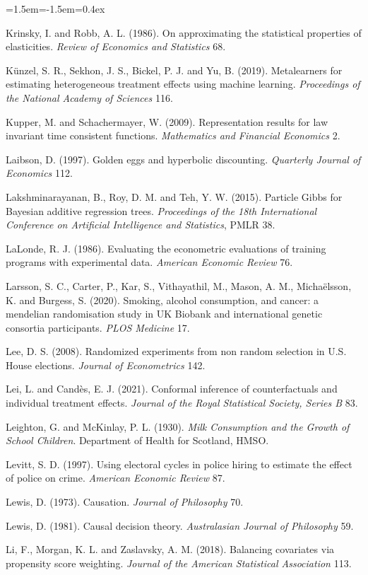 \begin{list}{}{\leftmargin=1.5em\itemindent=-1.5em\itemsep=0.4ex}
\item Krinsky, I. and Robb, A. L. (1986). On approximating the statistical properties of elasticities. \emph{Review of Economics and Statistics} 68.
\item K\"unzel, S. R., Sekhon, J. S., Bickel, P. J. and Yu, B. (2019). Metalearners for estimating heterogeneous treatment effects using machine learning. \emph{Proceedings of the National Academy of Sciences} 116.
\item Kupper, M. and Schachermayer, W. (2009). Representation results for law invariant time consistent functions. \emph{Mathematics and Financial Economics} 2.
\item Laibson, D. (1997). Golden eggs and hyperbolic discounting. \emph{Quarterly Journal of Economics} 112.
\item Lakshminarayanan, B., Roy, D. M. and Teh, Y. W. (2015). Particle Gibbs for Bayesian additive regression trees. \emph{Proceedings of the 18th International Conference on Artificial Intelligence and Statistics}, PMLR 38.
\item LaLonde, R. J. (1986). Evaluating the econometric evaluations of training programs with experimental data. \emph{American Economic Review} 76.
\item Larsson, S. C., Carter, P., Kar, S., Vithayathil, M., Mason, A. M., Micha\"elsson, K. and Burgess, S. (2020). Smoking, alcohol consumption, and cancer: a mendelian randomisation study in UK Biobank and international genetic consortia participants. \emph{PLOS Medicine} 17.
\item Lee, D. S. (2008). Randomized experiments from non random selection in U.S. House elections. \emph{Journal of Econometrics} 142.
\item Lei, L. and Cand\`es, E. J. (2021). Conformal inference of counterfactuals and individual treatment effects. \emph{Journal of the Royal Statistical Society, Series B} 83.
\item Leighton, G. and McKinlay, P. L. (1930). \emph{Milk Consumption and the Growth of School Children}. Department of Health for Scotland, HMSO.
\item Levitt, S. D. (1997). Using electoral cycles in police hiring to estimate the effect of police on crime. \emph{American Economic Review} 87.
\item Lewis, D. (1973). Causation. \emph{Journal of Philosophy} 70.
\item Lewis, D. (1981). Causal decision theory. \emph{Australasian Journal of Philosophy} 59.
\item Li, F., Morgan, K. L. and Zaslavsky, A. M. (2018). Balancing covariates via propensity score weighting. \emph{Journal of the American Statistical Association} 113.

\end{list}
